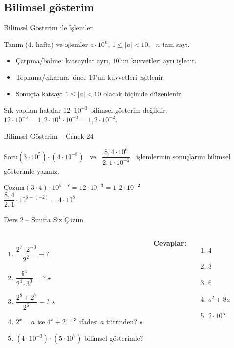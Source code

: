 \documentclass[aspectratio=169,11pt,handout]{beamer}
\newcommand{\soru}[3]{%
\begin{frame}{#1}
  \begin{block}{Soru}\large #2\end{block}
  \pause
  \begin{exampleblock}{Çözüm}\large #3\end{exampleblock}
\end{frame}}
\begin{document}
\subsection{Bilimsel gösterim}
\begin{frame}{Bilimsel Gösterim ile İşlemler}
\begin{block}{Tanım (4. hafta) ve işlemler}
\(a\cdot 10^n\), \quad \(1\le |a|<10\), \ \(n\) tam sayı.
\begin{itemize}
\item Çarpma/bölme: katsayılar ayrı, \(10\)'un kuvvetleri ayrı işlenir.
\item Toplama/çıkarma: önce \(10\)'un kuvvetleri eşitlenir.
\item Sonuçta katsayı \(1\le |a|<10\) olacak biçimde düzenlenir.
\end{itemize}
\end{block}
\begin{alertblock}{Sık yapılan hatalar}
\(12\cdot 10^{-3}\) bilimsel gösterim değildir: \ \(12\cdot 10^{-3}=1{,}2\cdot 10^{1}\cdot 10^{-3}=1{,}2\cdot 10^{-2}\).
\end{alertblock}
\end{frame}

\soru{Bilimsel Gösterim -- Örnek 24}
{\((3\cdot 10^5)\cdot(4\cdot 10^{-8})\) \ ve \ \(\dfrac{8{,}4\cdot 10^{6}}{2{,}1\cdot 10^{-2}}\) \ işlemlerinin sonuçlarını bilimsel gösterimle yazınız.}
{\((3\cdot 4)\cdot 10^{5-8}=12\cdot 10^{-3}=1{,}2\cdot 10^{-2}\)\\[4pt]
\(\dfrac{8{,}4}{2{,}1}\cdot 10^{6-(-2)}=4\cdot 10^{8}\)}

\begin{frame}{Ders 2 -- Sınıfta Siz Çözün}
\begin{columns}[t]
\begin{enumerate}
\item \(\dfrac{2^7\cdot 2^{-3}}{2^2}=?\)
\item \(\dfrac{6^4}{2^4\cdot 3^3}=?\) \(\star\)
\item \(\dfrac{2^8+2^7}{2^6}=?\) \(\star\)
\item \(2^x=a\) ise \(4^x+2^{x+3}\) ifadesi \(a\) türünden? \(\star\)
\item \((4\cdot 10^{-3})\cdot(5\cdot 10^{7})\) bilimsel gösterimle?
\end{enumerate}
\pause
\textbf{Cevaplar:}
\begin{enumerate}
\item \(4\)
\item \(3\)
\item \(6\)
\item \(a^2+8a\)
\item \(2\cdot 10^{5}\)
\end{enumerate}
\end{columns}
\vspace{4pt}{\footnotesize \(\star\) işaretli soruların adım adım çözümü sonraki slaytlardadır.}
\end{frame}
\end{document}
